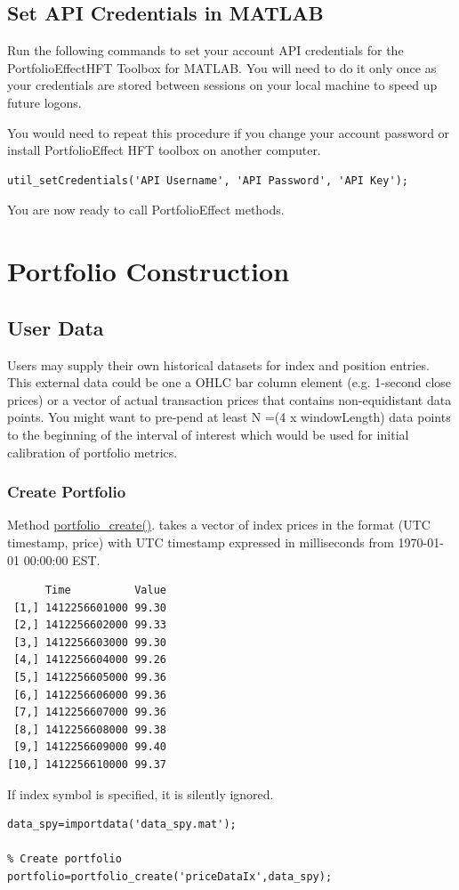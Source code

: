 \documentclass[letterpaper]{report}
\newcounter{N}
\begin{document}
\section{Set API Credentials in MATLAB} 
Run the following commands to set your account API credentials for the
PortfolioEffectHFT Toolbox for MATLAB.
You will need to do it only once as your credentials are stored between sessions
on your local machine to speed up future logons. \par You would need to repeat
this procedure if you change your account password or install PortfolioEffect
HFT toolbox on another computer.
\begin{lstlisting}
util_setCredentials('API Username', 'API Password', 'API Key');
\end{lstlisting}
You are now ready to call PortfolioEffect methods.


\chapter{Portfolio Construction}
\section{User Data}
Users may supply their own historical datasets for index and position entries. 
This external data could be one a OHLC bar column element (e.g. 1-second close prices) or a vector of actual transaction prices that contains non-equidistant data points. 
You might want to pre-pend at least N =(4 x windowLength) data points to the
beginning of the interval of interest which would be used for initial calibration of portfolio metrics.
\subsection{Create Portfolio} 
Method
\href{https://www.portfolioeffect.com/docs/platform/quant/functions/general-functions/portfolio-create}{portfolio\_create()}.
takes a vector of index prices in the format (UTC timestamp, price) with UTC
timestamp expressed in milliseconds from 1970-01-01 00:00:00 EST.
\begin{lstlisting}
      Time          Value
 [1,] 1412256601000 99.30
 [2,] 1412256602000 99.33
 [3,] 1412256603000 99.30
 [4,] 1412256604000 99.26
 [5,] 1412256605000 99.36
 [6,] 1412256606000 99.36
 [7,] 1412256607000 99.36
 [8,] 1412256608000 99.38
 [9,] 1412256609000 99.40
[10,] 1412256610000 99.37
\end{lstlisting}
If index symbol is specified, it is silently ignored.
\begin{lstlisting}
data_spy=importdata('data_spy.mat'); 

% Create portfolio
portfolio=portfolio_create('priceDataIx',data_spy);
\end{lstlisting}
\end{document}
